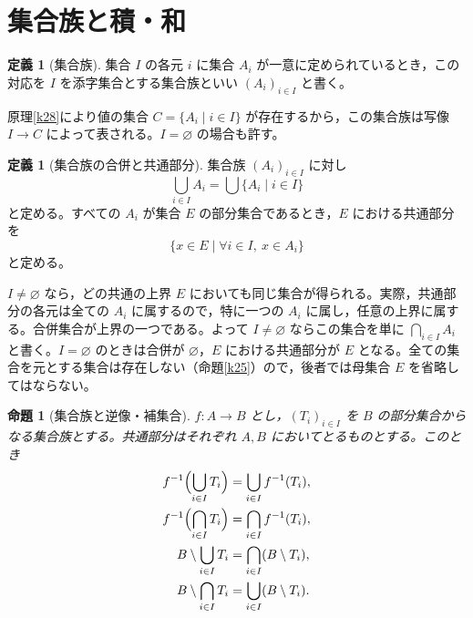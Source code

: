 \documentclass[a5paper,10pt,dvipdfmx]{jsarticle}
\theoremstyle{definition}
\newtheorem{defn}[ruledef]{定義}
\theoremstyle{plain}
\newtheorem{prop}[ruledef]{命題}
\begin{document}
\section{集合族と積・和}
\begin{defn}[集合族]\label{k44}
集合 $I$ の各元 $i$ に集合 $A_i$ が一意に定められているとき，この対応を $I$ を添字集合とする集合族といい $(A_i)_{i\in I}$ と書く。
\end{defn}
原理\ref{k28}により値の集合 $C=\{A_i\mid i\in I\}$ が存在するから，この集合族は写像 $I\to C$ によって表される。$I=\varnothing$ の場合も許す。
\begin{defn}[集合族の合併と共通部分]\label{k45}
集合族 $(A_i)_{i\in I}$ に対し
\[
 \bigcup_{i\in I}A_i=\bigcup\{A_i\mid i\in I\}
\]
と定める。すべての $A_i$ が集合 $E$ の部分集合であるとき，$E$ における共通部分を
\[
 \{x\in E\mid\forall i\in I,\ x\in A_i\}
\]
と定める。
\end{defn}
$I\ne\varnothing$ なら，どの共通の上界 $E$ においても同じ集合が得られる。実際，共通部分の各元は全ての $A_i$ に属するので，特に一つの $A_i$ に属し，任意の上界に属する。合併集合が上界の一つである。よって $I\ne\varnothing$ ならこの集合を単に $\bigcap_{i\in I} A_i$ と書く。$I=\varnothing$ のときは合併が $\varnothing$，$E$ における共通部分が $E$ となる。全ての集合を元とする集合は存在しない（命題\ref{k25}）ので，後者では母集合 $E$ を省略してはならない。
\begin{prop}[集合族と逆像・補集合]\label{k46}
$f:A\to B$ とし，$(T_i)_{i\in I}$ を $B$ の部分集合からなる集合族とする。共通部分はそれぞれ $A,B$ においてとるものとする。このとき
\begin{align*}
 f^{-1}\Bigl(\bigcup_{i\in I}T_i\Bigr)
   &=\bigcup_{i\in I}f^{-1}(T_i),\\
 f^{-1}\Bigl(\bigcap_{i\in I}T_i\Bigr)
   &=\bigcap_{i\in I}f^{-1}(T_i),\\
 B\setminus\bigcup_{i\in I}T_i
   &=\bigcap_{i\in I}(B\setminus T_i),\\
 B\setminus\bigcap_{i\in I}T_i
   &=\bigcup_{i\in I}(B\setminus T_i).
\end{align*}
\end{prop}
\end{document}
